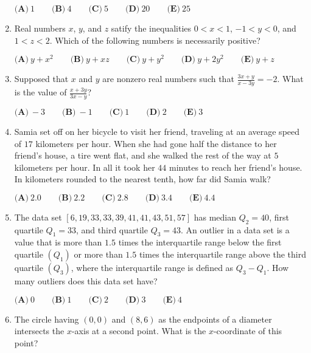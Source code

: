 \documentclass{article}
\begin{document}
\begin{enumerate}[label=\arabic*., itemsep=0.5em]
$\textbf{(A)}\ 1\qquad\textbf{(B)}\ 4\qquad\textbf{(C)}\ 5\qquad\textbf{(D)}\ 20\qquad\textbf{(E)}\ 25$\par \vspace{0.5em}\item Real numbers $x$, $y$, and $z$ satify the inequalities
$0<x<1$, $-1<y<0$, and $1<z<2$.
Which of the following numbers is necessarily positive?

$\textbf{(A)}\ y+x^2\qquad\textbf{(B)}\ y+xz\qquad\textbf{(C)}\ y+y^2\qquad\textbf{(D)}\ y+2y^2\qquad\textbf{(E)}\ y+z$\par \vspace{0.5em}\item Supposed that $x$ and $y$ are nonzero real numbers such that $\frac{3x+y}{x-3y}=-2$. What is the value of $\frac{x+3y}{3x-y}$?

$\textbf{(A)}\ -3\qquad\textbf{(B)}\ -1\qquad\textbf{(C)}\ 1\qquad\textbf{(D)}\ 2\qquad\textbf{(E)}\ 3$\par \vspace{0.5em}\item Samia set off on her bicycle to visit her friend, traveling at an average speed of $17$ kilometers per hour. When she had gone half the distance to her friend's house, a tire went flat, and she walked the rest of the way at $5$ kilometers per hour. In all it took her $44$ minutes to reach her friend's house. In kilometers rounded to the nearest tenth, how far did Samia walk?

$\textbf{(A)}\ 2.0\qquad\textbf{(B)}\ 2.2\qquad\textbf{(C)}\ 2.8\qquad\textbf{(D)}\ 3.4\qquad\textbf{(E)}\ 4.4$\par \vspace{0.5em}\item The data set $[6,19,33,33,39,41,41,43,51,57]$ has median $Q_2 = 40$, first quartile $Q_1 = 33$, and third quartile $Q_3=43$. An outlier in a data set is a value that is more than $1.5$ times the interquartile range below the first quartile $(Q_1)$ or more than $1.5$ times the interquartile range above the third quartile $(Q_3)$, where the interquartile range is defined as $Q_3 - Q_1$. How many outliers does this data set have?

$\textbf{(A)}\ 0\qquad\textbf{(B)}\ 1\qquad\textbf{(C)}\ 2\qquad\textbf{(D)}\ 3\qquad\textbf{(E)}\ 4$\par \vspace{0.5em}\item The circle having $(0,0)$ and $(8,6)$ as the endpoints of a diameter intersects the $x$-axis at a second point. What is the $x$-coordinate of this point? 


\end{enumerate}
\end{document}
